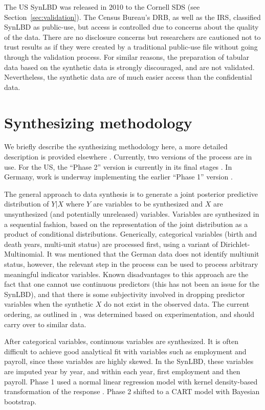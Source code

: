 \documentclass[letterpaper,12pt]{article}
\begin{document}
The US SynLBD was released in 2010 to the Cornell \ac{SDS} (see Section~\ref{sec:validation}). The Census Bureau’s \ac{DRB}, as well as the \ac{IRS},  classified SynLBD as public-use, but access is controlled due to concerns about the quality of the data. There are no disclosure concerns but researchers are cautioned not to trust results as if they were created by a traditional public-use file without going through the validation process. For similar reasons, the preparation of tabular data based on the synthetic data is strongly discouraged, and are not validated. Nevertheless, the synthetic data are of much easier access than the confidential data.

\section{Synthesizing methodology}
We briefly describe the synthesizing methodology here, a more detailed description is provided elsewhere \citep{KinneyEtAl2011,Kinney_et_al_2011_Appendix}. Currently, two versions of the process are in use. For the US, the “Phase 2” version is currently in its final stages \citep{RePEc:cen:wpaper:14-12}. In Germany, work is underway implementing the earlier “Phase 1” version \citep{RePEc:cen:wpaper:14-13}.

The general approach to data synthesis is to generate a joint posterior predictive distribution of $Y|X$ where $Y$ are variables to be synthesized and $X$ are unsynthesized (and potentially unreleased) variables. Variables are synthesized in a sequential fashion, based on the representation of the joint distribution as a product of conditional distributions. Generically, categorical variables (birth and death years, multi-unit status) are processed first,  using a variant of  Dirichlet-Multinomial.  It was mentioned that the German data does not identify  multiunit status, however, the relevant step in the process can be used to process arbitrary meaningful indicator variables.  Known disadvantages to this approach are the fact that one cannot use continuous predictors (this has not been an issue for the SynLBD), and that there is some subjectivity involved in dropping predictor variables when the synthetic $X$ do not exist in the observed data. The current ordering, as outlined in \citet{KinneyEtAl2011}, was determined based on experimentation, and should carry over to similar data. 

After categorical variables, continuous variables are synthesized. It is often difficult to achieve good analytical fit with variables such as employment and payroll, since these variables are highly skewed. In the SynLBD, these variables are imputed year by year, and within each year, first employment and then payroll. Phase 1 used a normal linear regression model with kernel density-based  transformation of the response \citep{woodcock2009distribution}. Phase 2 shifted to a CART model with Bayesian bootstrap.
\end{document}
